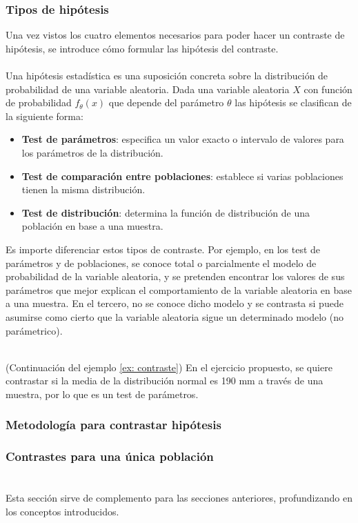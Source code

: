 \subsubsection{Tipos de hipótesis}
Una vez vistos los cuatro elementos necesarios para poder hacer un contraste de hipótesis, se introduce cómo formular las hipótesis del contraste.\\\\
Una hipótesis estadística es una suposición concreta sobre la distribución de probabilidad de una variable aleatoria. Dada una variable aleatoria $X$ con función de probabilidad $f_\theta(x)$ que depende del parámetro $\theta$ las hipótesis se clasifican de la siguiente forma:
\begin{itemize}
	\item \textbf{Test de parámetros}: especifica un valor exacto o intervalo de valores para los parámetros de la distribución.
	\item \textbf{Test de comparación entre poblaciones}: establece si varias poblaciones tienen la misma distribución.
	\item \textbf{Test de distribución}: determina la función de distribución de una población en base a una muestra.
\end{itemize}
Es importe diferenciar estos tipos de contraste. Por ejemplo, en los test de parámetros y de poblaciones, se conoce total o parcialmente el modelo de probabilidad de la variable aleatoria, y se pretenden encontrar los valores de sus parámetros que mejor explican el comportamiento de la variable aleatoria en base a una muestra. En el tercero, no se conoce dicho modelo y se contrasta si puede asumirse como cierto que la variable aleatoria sigue un determinado modelo (no parámetrico).\\\\

\begin{example}(Continuación del ejemplo \ref{ex: contraste})
En el ejercicio propuesto, se quiere contrastar si la media de la distribución normal es 190 mm a través de una muestra, por lo que es un test de parámetros.
\end{example}

\subsubsection{Metodología para contrastar hipótesis}
\subsubsection{Contrastes para una única población}
\break
\section*{}
Esta sección sirve de complemento para las secciones anteriores, profundizando en los conceptos introducidos. 
\section*{}
\section*{}
